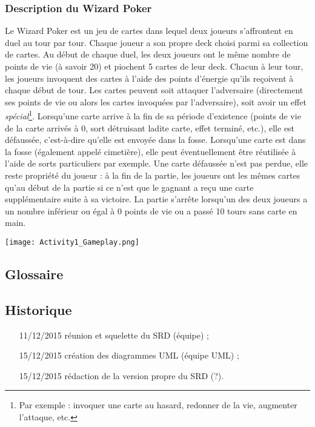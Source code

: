 \documentclass{article}
\begin{document}
        \subsubsection{Description du Wizard Poker}
            Le Wizard Poker est un jeu de cartes dans lequel deux joueurs s'affrontent en \gls{duel} au tour par tour. Chaque joueur a son propre \gls{deck}
            choisi parmi sa collection de cartes. Au début de chaque duel, les deux joueurs ont le même nombre de points de vie (à savoir 20) et piochent 5
            cartes de leur \gls{deck}. Chacun à leur tour, les joueurs invoquent des cartes à l'aide des points d'énergie qu'ils reçoivent à chaque début de tour.
            Les cartes peuvent soit attaquer l'adversaire (directement ses points de vie ou alors les cartes invoquées par l'adversaire), soit avoir
            un effet \textit{spécial}\footnote{Par exemple : invoquer une carte au hasard, redonner de la vie, augmenter l'attaque, etc.}. Lorsqu'une carte
            arrive à la fin de sa période d'existence (points de vie de la carte arrivés à 0, sort détruisant ladite carte, effet terminé, etc.), elle est
            défaussée, c'est-à-dire qu'elle est envoyée dans la \gls{fosse}. Lorsqu'une carte est dans la fosse (également appelé cimetière), elle
            peut éventuellement être réutilisée à l'aide de sorts particuliers par exemple. Une carte défaussée n'est pas perdue, elle reste propriété du joueur :
            à la fin de la partie, les joueurs ont les mêmes cartes qu'au début de la partie si ce n'est que le gagnant a reçu une carte supplémentaire
            suite à sa victoire. La partie s'arrête lorsqu'un des deux joueurs a un nombre inférieur ou égal à 0 points de vie ou a passé 10 tours sans carte en main.
            \begin{center}\texttt{[image: Activity1\_Gameplay.png]}\end{center}

    \subsection{Glossaire}  %
        \printglossary[type=glossary, style=noIndex, title=]

    \subsection{Historique}
        \begin{itemize}
            \item[11/12/2015] réunion et squelette du SRD (équipe) ;
            \item[15/12/2015] création des diagrammes UML (équipe UML) ;  %
            \item[15/12/2015] rédaction de la version propre du SRD (?).
        \end{itemize}
\end{document}
